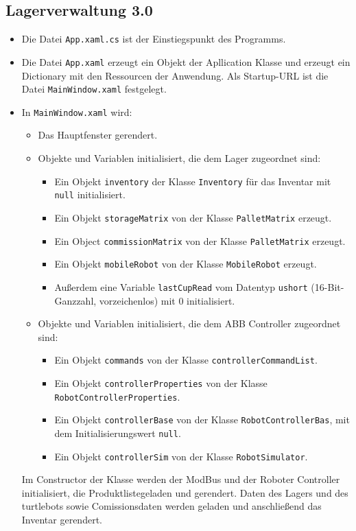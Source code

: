     \subsection {Lagerverwaltung 3.0}
    \begin{itemize}
        \item Die Datei \verb|App.xaml.cs| ist der Einstiegspunkt des Programms.
        \item Die Datei \verb|App.xaml| erzeugt ein Objekt der Apllication Klasse und erzeugt ein Dictionary mit den Ressourcen der Anwendung. Als Startup-URL ist die Datei \verb |MainWindow.xaml| festgelegt.
        \item In \verb|MainWindow.xaml| wird:
        \begin{itemize}
            \item Das Hauptfenster gerendert.
            \item Objekte und Variablen initialisiert, die dem Lager zugeordnet sind:
            \begin{itemize}
                \item Ein Objekt \verb|inventory| der Klasse \verb|Inventory| für das Inventar mit \verb|null| initialisiert.
                \item Ein Objekt \verb|storageMatrix| von der Klasse \verb|PalletMatrix| erzeugt.
                \item Ein Object \verb|commissionMatrix| von der Klasse \verb|PalletMatrix| erzeugt.
                \item Ein Objekt \verb|mobileRobot| von der Klasse \verb |MobileRobot| erzeugt.
                \item Außerdem eine Variable \verb|lastCupRead| vom Datentyp \verb|ushort| (16-Bit-Ganzzahl, vorzeichenlos) mit 0 initialisiert.
            \end{itemize}
            \item Objekte und Variablen initialisiert, die dem ABB Controller zugeordnet sind:
            \begin{itemize}
                \item Ein Objekt \verb|commands| von der Klasse \verb|controllerCommandList|.
                \item Ein Objekt \verb|controllerProperties| von der Klasse \verb|RobotControllerProperties|.
                \item Ein Objekt \verb|controllerBase| von der Klasse \verb|RobotControllerBas|, mit dem Initialisierungswert \verb|null|.
                \item Ein Objekt \verb|controllerSim| von der Klasse \verb|RobotSimulator|.
            \end{itemize}
        \end{itemize}
        Im Constructor der Klasse werden der ModBus und der Roboter Controller initialisiert, die Produktlistegeladen und gerendert.
        Daten des Lagers und des turtlebots sowie Comissionsdaten werden geladen und anschließend das Inventar gerendert.
    \end{itemize}
